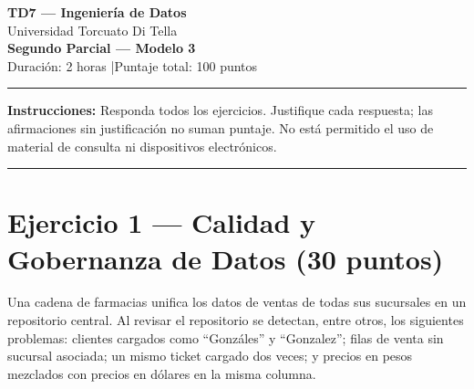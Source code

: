 \documentclass[11pt,a4paper]{article}
\begin{document}
\begin{center}
  {\LARGE\bfseries TD7 — Ingeniería de Datos}\\[6pt]
  {\large Universidad Torcuato Di Tella}\\[4pt]
  {\Large\bfseries Segundo Parcial — Modelo 3}\\[4pt]
  {\normalsize Duración: 2 horas \quad|\quad Puntaje total: 100 puntos}
\end{center}
\noindent\rule{\linewidth}{0.8pt}
\vspace{2pt}

\noindent\textbf{Instrucciones:} Responda todos los ejercicios. Justifique cada respuesta; las afirmaciones sin justificación no suman puntaje. No está permitido el uso de material de consulta ni dispositivos electrónicos.

\vspace{6pt}
\noindent\rule{\linewidth}{0.4pt}

\section*{Ejercicio 1 — Calidad y Gobernanza de Datos \hfill\normalfont(30 puntos)}

Una cadena de farmacias unifica los datos de ventas de todas sus sucursales en un repositorio central. Al revisar el repositorio se detectan, entre otros, los siguientes problemas: clientes cargados como ``Gonzáles'' y ``Gonzalez''; filas de venta sin sucursal asociada; un mismo ticket cargado dos veces; y precios en pesos mezclados con precios en dólares en la misma columna.
\end{document}
